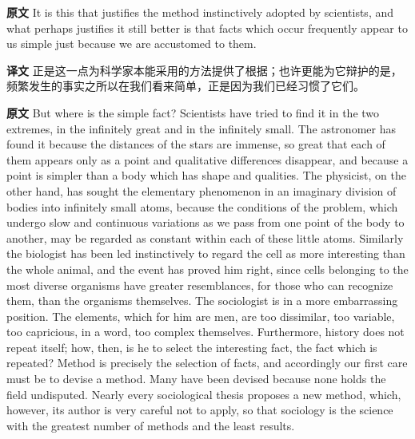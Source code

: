 \documentclass[UTF8]{ctexart}
\newenvironment{english}{\par\small\noindent\textbf{原文}\quad\ignorespaces}{\par}
\newenvironment{zhtranslation}{\par\noindent\textbf{译文}\quad\ignorespaces}{\par\vspace{0.35em}}
\begin{document}
\begin{english}
It is this that justifies the method instinctively adopted by scientists, and what perhaps justifies it still better is that facts which occur frequently appear to us simple just because we are accustomed to them.
\end{english}
\begin{zhtranslation}
正是这一点为科学家本能采用的方法提供了根据；也许更能为它辩护的是，频繁发生的事实之所以在我们看来简单，正是因为我们已经习惯了它们。\end{zhtranslation}

\begin{english}
But where is the simple fact? Scientists have tried to find it in the two extremes, in the infinitely great and in the infinitely small. The astronomer has found it because the distances of the stars are immense, so great that each of them appears only as a point and qualitative differences disappear, and because a point is simpler than a body which has shape and qualities. The physicist, on the other hand, has sought the elementary phenomenon in an imaginary division of bodies into infinitely small atoms, because the conditions of the problem, which undergo slow and continuous variations as we pass from one point of the body to another, may be regarded as constant within each of these little atoms. Similarly the biologist has been led instinctively to regard the cell as more interesting than the whole animal, and the event has proved him right, since cells belonging to the most diverse organisms have greater resemblances, for those who can recognize them, than the organisms themselves. The sociologist is in a more embarrassing position. The elements, which for him are men, are too dissimilar, too variable, too capricious, in a word, too complex themselves. Furthermore, history does not repeat itself; how, then, is he to select the interesting fact, the fact which is repeated? Method is precisely the selection of facts, and accordingly our first care must be to devise a method. Many have been devised because none holds the field undisputed. Nearly every sociological thesis proposes a new method, which, however, its author is very careful not to apply, so that sociology is the science with the greatest number of methods and the least results.
\end{english}
\end{document}
